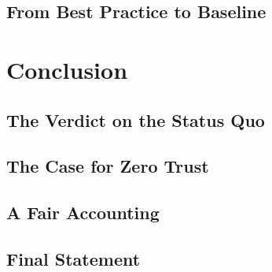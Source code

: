 \documentclass[12pt, letterpaper]{article}
\begin{document}
\subsection{From Best Practice to Baseline}

\section{Conclusion}

\subsection{The Verdict on the Status Quo}

\subsection{The Case for Zero Trust}

\subsection{A Fair Accounting}

\subsection{Final Statement}

\newpage

\end{document}
